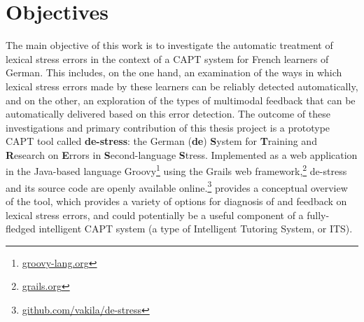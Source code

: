 \section{Objectives}
\label{sec:intro:objectives}


The main objective of this work is to investigate the automatic treatment of lexical stress errors in the context of a CAPT system for French learners of German. This includes, on the one hand, an examination of the ways in which lexical stress errors 
	made by these learners
	can be reliably detected %
automatically, and on the other, an exploration of the types of multimodal feedback 
	that can be automatically delivered based on this error detection. 
%
%
%
The outcome of these investigations and primary contribution of this thesis project is a prototype CAPT tool called 
%
%
%
\textbf{de-stress}: the German (\textbf{de}) \textbf{S}ystem for \textbf{T}raining and \textbf{R}esearch on \textbf{E}rrors in \textbf{S}econd-language \textbf{S}tress. 
%
Implemented as a web application in the Java-based language Groovy\footnote{\url{groovy-lang.org}} 
using the Grails web framework,\footnote{\url{grails.org}} 
de-stress and its source code are openly available online.\footnote{\url{github.com/vakila/de-stress}}
 provides a conceptual overview of the tool, which provides a variety of options for diagnosis of and feedback on lexical stress errors, and could potentially be a useful component of a fully-fledged intelligent CAPT system (a type of Intelligent Tutoring System, or ITS). 

